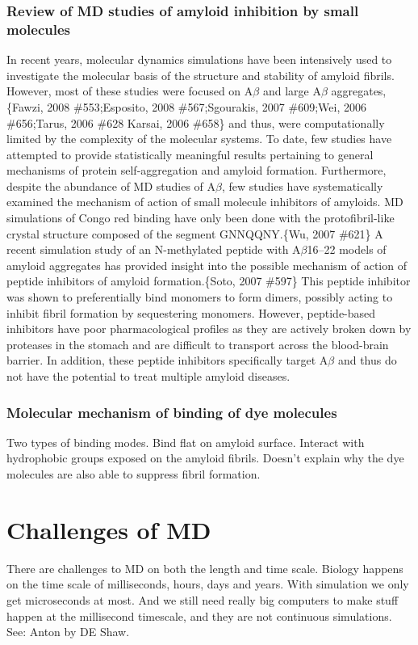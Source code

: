 \subsubsection{Review of MD studies of amyloid inhibition by small molecules}
\1 In recent years, molecular dynamics simulations have been intensively used to investigate the molecular basis of the structure and stability of amyloid fibrils. However, most of these studies were focused on A$\beta$ and large A$\beta$ aggregates,\{Fawzi, 2008 \#553;Esposito, 2008 \#567;Sgourakis, 2007 \#609;Wei, 2006 \#656;Tarus, 2006 \#628 Karsai, 2006 \#658\} and thus, were computationally limited by the complexity of the molecular systems. To date, few studies have attempted to provide statistically meaningful results pertaining to general mechanisms of protein self-aggregation and amyloid formation. Furthermore, despite the abundance of MD studies of A$\beta$, few studies have systematically examined the mechanism of action of small molecule inhibitors of amyloids. MD simulations of Congo red binding have only been done with the protofibril-like crystal structure composed of the segment GNNQQNY.\{Wu, 2007 \#621\} A recent simulation study of an N-methylated peptide with A$\beta$16--22 models of amyloid aggregates has provided insight into the possible mechanism of action of peptide inhibitors of amyloid formation.\{Soto, 2007 \#597\} This peptide inhibitor was shown to preferentially bind monomers to form dimers, possibly acting to inhibit fibril formation by sequestering monomers. However, peptide-based inhibitors have poor pharmacological profiles as they are actively broken down by proteases in the stomach and are difficult to transport across the blood-brain barrier. In addition, these peptide inhibitors specifically target A$\beta$ and thus do not have the potential to treat multiple amyloid diseases.

\subsubsection{Molecular mechanism of binding of dye molecules}
Two types of binding modes. Bind flat on amyloid surface. Interact with hydrophobic groups exposed on the amyloid fibrils.
Doesn't explain why the dye molecules are also able to suppress fibril formation.


\section{Challenges of MD}
\1 There are challenges to MD on both the length and time scale. Biology happens on the time scale of milliseconds, hours, days and years. With simulation we only get microseconds at most.  And we still need really big computers to make stuff happen at the millisecond timescale, and they are not continuous simulations. See: Anton by DE Shaw. 

